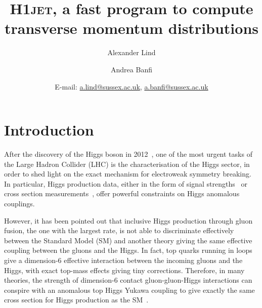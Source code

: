 \documentclass[12pt]{article}
\title{\vspace{-10mm}\textbf{\textsc{H1jet}, a fast program to compute transverse momentum distributions}\blfootnote{\textsc{H1jet} can be obtained from ref.~\cite{h1jet}.}}
\author{Alexander Lind}
\author{Andrea Banfi}
\affil{Department of Physics and Astronomy, University of Sussex, BN1 9QH Brighton, UK}
\date{\small E-mail: \href{mailto:a.lind@sussex.ac.uk}{a.lind@sussex.ac.uk}, \href{mailto:a.banfi@sussex.ac.uk}{a.banfi@sussex.ac.uk}}
\begin{document}
\maketitle


\tableofcontents 

\newpage 

\section{Introduction}
\label{sec:intro}

After the discovery of the Higgs boson in
2012~\cite{Aad:2012tfa,Chatrchyan:2012ufa}, one of the most urgent tasks of
the Large Hadron Collider (LHC) is the characterisation of the Higgs
sector, in order to shed light on the exact mechanism for electroweak
symmetry breaking. In particular, Higgs production data, either in the
form of signal strengths~\cite{Aad:2019mbh,Sirunyan:2018koj} or cross
section measurements~\cite{Aaboud:2018ezd,Sirunyan:2018sgc}, offer
powerful constraints on Higgs anomalous couplings.

However, it has been pointed out that inclusive Higgs production
through gluon fusion, the one with the largest rate, is not able to
discriminate effectively between the Standard Model (SM) and another
theory giving the same effective coupling between the gluons and the
Higgs. In fact, top quarks running in loops give a dimension-6
effective interaction between the incoming gluons and the Higgs, with
exact top-mass effects giving tiny corrections. Therefore, in many
theories, the strength of dimension-6 contact gluon-gluon-Higgs
interactions can conspire with an anomalous top Higgs Yukawa coupling
to give exactly the same cross section for Higgs production as the
SM~\cite{Azatov:2013xha,Grojean:2013nya,Banfi:2013yoa}.
\end{document}

